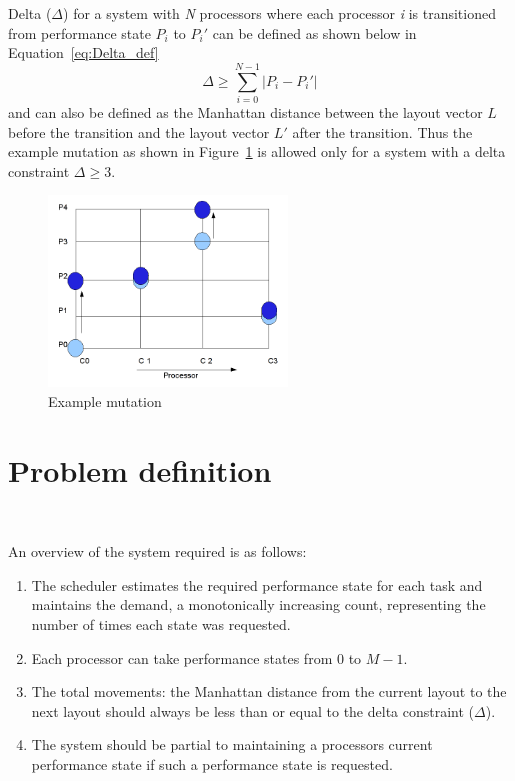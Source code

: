 Delta ($\Delta$) for a system with \textit{N} processors where each processor \textit{i} is transitioned
from performance state $P_{i}$ to $P_{i}'$ can be defined as shown below in Equation~\eqref{eq:Delta_def}
\begin{equation}
    \Delta \geq \displaystyle\sum_{i=0}^{N-1} {| P_{i} - P_{i}' |}
\label{eq:Delta_def}
\end{equation}
and can also be defined as the Manhattan distance between the layout vector $L$ before the transition and 
the layout vector $L'$ after the transition. Thus the example mutation as shown in Figure~\ref{fig:ex_mutation}
is allowed only for a system with a delta constraint $\Delta \geq 3$. 

\begin{figure}[h!]
  \begin{center}
    \includegraphics[height=2in]{figures/example_mutation_3.png}
    \caption{Example mutation}
    \label{fig:ex_mutation}
  \end{center}
\end{figure}



\section{Problem definition}~\label{sec:ago}

An overview of the system required is as follows:
\begin{enumerate}
\item The scheduler estimates the required performance state for each task and maintains the demand, 
a monotonically increasing count, representing the number of times each state was requested. 
\item Each processor can take performance states from $0$ to $M-1$. 
\item The total movements: the Manhattan distance from the current layout to the next layout 
should always be less than or equal to the delta constraint ($\Delta$). 
\item The system should be partial to maintaining a processors current performance state if such a performance state is requested.
\end{enumerate}

